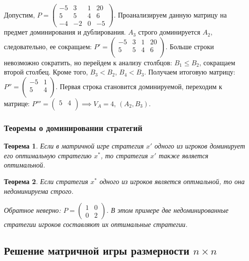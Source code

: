 \documentclass{article}
\newtheorem{theorem}{Теорема}
\begin{document}
Допустим, $P = \begin{pmatrix}
    -5 & 3 & 1 & 20 \\
    5 & 5 & 4 & 6 \\
    -4 & -2 & 0 & -5
\end{pmatrix}$. Проанализируем данную матрицу на предмет доминирования и дублирования. $A_{3}$ строго доминируется $A_{2}$, следовательно, ее сокращаем: $P' = \begin{pmatrix}
    -5 & 3 & 1 & 20 \\
    5 & 5 & 4 & 6 \\
\end{pmatrix}$. Больше строки невозможно сократить, но перейдем к анализу столбцов: $B_{1} \le B_{2}$, сокращаем второй столбец. Кроме того, $B_{3} < B_{2}$, $B_{4} < B_{3}$. Получаем итоговую матрицу: $P'' = \begin{pmatrix}
    -5 & 1 \\
    5 & 4 \\
\end{pmatrix}$. Первая строка становится доминируемой, переходим к матрице: $P''' = \begin{pmatrix}
    5 & 4 \\
\end{pmatrix} \implies V_{A} = 4$, $(A_2, B_3)$.

\subsubsection{Теоремы о доминировании стратегий}

\begin{theorem}
    Если в матричной игре стратегия $x'$ одного из игроков доминирует его оптимальную стратегию $x^{*}$, то стратегия $x'$ также является оптимальной.
\end{theorem}

\begin{theorem}
    Если стратегия $x^{*}$ одного из игроков является оптмальной, то она недоминируема строго.

    Обратное неверно: $P = \begin{pmatrix}
        1 & 0 \\
        0 & 2
    \end{pmatrix}$. В этом примере две недоминированные стратегии игроков составляют их оптимальные стратегии.
\end{theorem}

\subsection{Решение матричной игры размерности $n \times n$}
\end{document}
